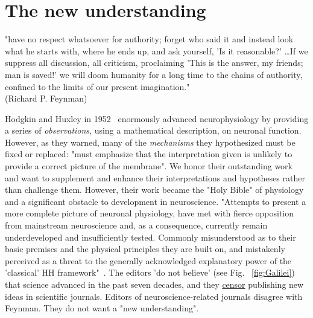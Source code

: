                                                                                                        \section*{The new understanding\label{State-NewUnderstanding}}                                                                                                       
                                                                                                     
                                                                                                     \quotationbox
{
"have no respect whatsoever for authority; forget who said it and instead look what he starts with, where he ends up, and ask yourself, 'Is it reasonable?' \dots If we suppress all discussion, all criticism, proclaiming 'This is the answer, my friends; man is saved!' we will doom humanity for a long time to the chains of authority, confined to the limits of our present imagination."\\ (Richard P. Feynman)}

Hodgkin and Huxley in 1952~\cite{HodgkinHuxley:1952} enormously advanced neurophysiology by providing a series of \textit{observations}, using a mathematical description, on neuronal function.                                                                                                 However, as they warned, many of the \textit{mechanisms} they hypothesized must be fixed or replaced: "must emphasize
that the interpretation given is unlikely to provide a correct picture of the membrane". We honor their outstanding work and want to supplement and enhance their interpretations and hypotheses rather than challenge them.
However, their work became the "Holy Bible" of physiology
and a significant obstacle to development in neuroscience.
"Attempts to present a more complete picture of neuronal
physiology, have met with fierce opposition from mainstream neuroscience and,
as a consequence, currently remain underdeveloped and insufficiently tested. Commonly misunderstood as to their basic premises and the physical principles they are built on, and mistakenly perceived as a threat to the generally acknowledged explanatory power of the 'classical' HH framework"~\cite{NerveSignalAsWindow:2023}. The editors 'do not believe' (see Fig. ~\ref{fig:Galilei}) that science advanced in the past seven decades, and they \href{https://dictionary.cambridge.org/dictionary/english/censor}{censor}
publishing new ideas in scientific journals.
Editors of neuroscience-related journals disagree with Feynman. They do not want a "new understanding".

